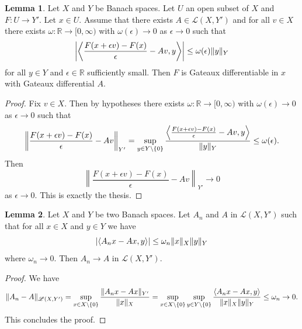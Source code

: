 \documentclass[a4paper,10pt,twoside]{amsbook}
\numberwithin{section}{chapter}
\numberwithin{equation}{chapter}
\theoremstyle{definition}
\newtheorem{prop}{Proposition}[chapter]
\newtheorem{lemma}[prop]{Lemma}
\DeclarePairedDelimiter{\norm}{\lVert}{\rVert}
\DeclarePairedDelimiter{\dual}{\langle}{\rangle}
\begin{document}
\begin{lemma}
\label{lemma:check-gateaux}
Let $X$ and $Y$ be Banach spaces. Let $U$ an open subset of $X$ and $F\colon U\to Y'$. Let $x\in U$. Assume that there exists $A\in\mathscr{L}(X,Y')$ and for all $v\in X$ there exists $\omega\colon\mathbb{R}\to[0,\infty)$ with $\omega(\epsilon)\to0$ as $\epsilon\to0$ such that
\[
\left|\left\langle\frac{F(x+\epsilon v)-F(x)}{\epsilon}-Av,y\right\rangle\right|\le\omega(\epsilon)\norm{y}_Y
\]
for all $y\in Y$ and $\epsilon\in\mathbb{R}$ sufficiently small. Then $F$ is Gateaux differentiable in $x$ with Gateaux differential $A$.
\end{lemma}
\begin{proof}
Fix $v\in X$. Then by hypotheses there exists $\omega\colon\mathbb{R}\to[0,\infty)$ with $\omega(\epsilon)\to0$ as $\epsilon\to0$ such that
\[
\left\lVert\frac{F(x+\epsilon v)-F(x)}{\epsilon}-Av\right\lVert_{Y'}=\sup_{y\in Y\setminus\{0\}}\frac{\left\langle\frac{F(x+\epsilon v)-F(x)}{\epsilon}-Av,y\right\rangle}{\norm{y}_Y}\le\omega(\epsilon).
\]
Then
\[
\left\lVert\frac{F(x+\epsilon v)-F(x)}{\epsilon}-Av\right\lVert_{Y'}\to0
\]
as $\epsilon\to 0$. This is exactly the thesis.
\end{proof}

\begin{lemma}
\label{lemma:check-continuity-gateaux}
Let $X$ and $Y$ be two Banach spaces. Let $A_n$ and $A$ in $\mathscr{L}(X,Y')$ such that for all $x\in X$ and $y\in Y$ we have
\[
|\dual{A_nx-Ax,y}|\le\omega_n\norm{x}_X\norm{y}_Y
\]
where $\omega_n\to0$. Then $A_n\to A$ in $\mathscr{L}(X,Y')$.
\end{lemma}
\begin{proof}
We have
\[
\norm{A_n-A}_{\mathscr{L}(X,Y')}=\sup_{x\in X\setminus\{0\}}\frac{\norm{A_nx-Ax}_{Y'}}{\norm{x}_X}=\sup_{x\in X\setminus\{0\}}\sup_{y\in Y\setminus\{0\}}\frac{\dual{A_nx-Ax,y}}{\norm{x}_X\norm{y}_Y}\le\omega_n\to 0.
\]
This concludes the proof.
\end{proof}

\end{document}
